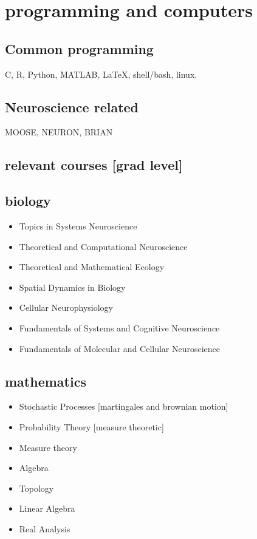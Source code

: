 \documentclass[11pt]{friggeri-cv}%
\begin{document}
\section{programming and computers}
\subsection{Common programming}
C,
 R, 
 Python,
    MATLAB,
{    \lotsoftextfont \LaTeX},
    shell/bash,
    linux.
\subsection{Neuroscience related}
MOOSE, NEURON, BRIAN 



\begin{multicols}{2}[]

\begin{minipage}{1.1\columnwidth}
\section{relevant courses [grad level]}


\subsection{biology}

\begin{itemize}
\item Topics in Systems Neuroscience
\item Theoretical and Computational Neuroscience
\item Theoretical and Mathematical Ecology
\item Spatial Dynamics in Biology
\item Cellular Neurophysiology
\item Fundamentals of Systems and Cognitive Neuroscience
\item Fundamentals of Molecular and Cellular Neuroscience
\end{itemize}


\subsection{mathematics}
\begin{itemize}

\item Stochastic Processes {\small[martingales and brownian motion]}
\item Probability Theory {\small[measure theoretic]}
\item Measure theory
\item Algebra
\item Topology
\item Linear Algebra
\item Real Analysis
\end{itemize}


\end{minipage}
\end{multicols}
\end{document}
